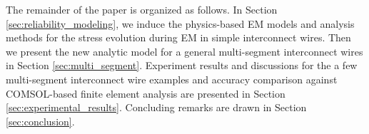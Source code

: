 The remainder of the paper is organized as follows. In Section
\ref{sec:reliability_modeling}, we induce the physics-based EM models
and analysis methods for the stress evolution during EM in simple
interconnect wires. Then we present the new analytic model for a
general multi-segment interconnect wires in Section
\ref{sec:multi_segment}. Experiment results and discussions for the a
few multi-segment interconnect wire examples and accuracy comparison
against COMSOL-based finite element analysis are presented in Section
\ref{sec:experimental_results}. Concluding remarks are drawn in
Section \ref{sec:conclusion}.



